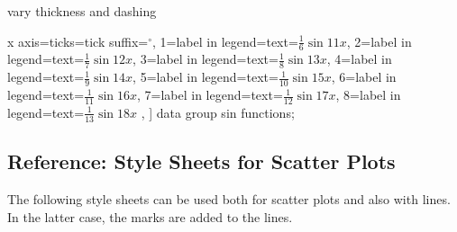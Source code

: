 \begin{stylesheet}{vary thickness and dashing}
\begin{codeexample}
{{{    x axis={ticks={tick suffix=${}^\circ$}},
    1={label in legend={text=$\frac{1}{6}\sin 11x$}},
    2={label in legend={text=$\frac{1}{7}\sin 12x$}},
    3={label in legend={text=$\frac{1}{8}\sin 13x$}},
    4={label in legend={text=$\frac{1}{9}\sin 14x$}},
    5={label in legend={text=$\frac{1}{10}\sin 15x$}},
    6={label in legend={text=$\frac{1}{11}\sin 16x$}},
    7={label in legend={text=$\frac{1}{12}\sin 17x$}},
    8={label in legend={text=$\frac{1}{13}\sin 18x$}}
  }
}},
]
\tikz \datavisualization [
  visualize as smooth line/.list=
    {1,2,3,4,5,6,7,8},
  example visualization,
  style sheet=vary thickness,
  style sheet=vary dashing]
data group {sin functions};
\end{codeexample}
\end{stylesheet}


\subsection{Reference: Style Sheets for Scatter Plots}

The following style sheets can be used both for scatter plots and also with
lines. In the latter case, the marks are added to the lines.

